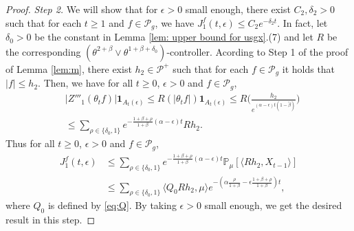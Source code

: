\documentclass[12pt,a4paper]{amsart}
\theoremstyle{plain}
\theoremstyle{definition}
\numberwithin{equation}{section}
\begin{document}
\begin{proof}
\emph{Step 2.} We will show that for $\epsilon>0$ small enough, there exist  $C_2, \delta_2>0$ such that for each $t\geq 1$ and
$f \in \mathcal P_g$, we have
\(
  J^f_1(t,\epsilon)
  \leq C_2e^{-\delta_2 t}.
\)
In fact, let $\delta_0 >0$ be the constant in Lemma \ref{lem: upper bound for usgx}.(7) and let $R$ be the corresponding $(\theta^{2+\beta}\vee \theta^{1+\beta+\delta_0})$-controller.
Acording to Step 1 of the proof of Lemma \ref{lem:m},
    there exist $h_{2} \in \mathcal P^+$ such that for each $f \in \mathcal P_g$ it holds that $|f| \leq h_{2}$.
Then, we have for all $t\geq 0$, $\epsilon> 0$ and $f\in \mathcal P_g$,
\begin{align}
  & |Z'''_1(\theta_t f)|\mathbf{1}_{A_{t}(\epsilon)}
     \leq R(|\theta_{t} f|)\mathbf{1}_{A_{t}(\epsilon)}
     \leq R \Big(\frac{h_{2}}{e^{(\alpha-\epsilon)t(1-\tilde \beta)}}\Big) \\
      & \leq \sum_{\rho \in \{\delta_0,1\}}e^{-\frac{1+\beta+\rho}{1+\beta}(\alpha-\epsilon)t}Rh_{2}.
\end{align}
 Thus for all $t\geq 0$, $\epsilon> 0$ and $f\in \mathcal P_g$,
\begin{align}
  \label{eq: estimate of J1}
  J^f_1(t,\epsilon)
& \leq \sum_{\rho \in \{\delta_0,1\}}e^{-\frac{1+\beta+\rho}{1+\beta}(\alpha-\epsilon)t}\mathbb{P}_{\mu}[\langle Rh_2,X_{t-1}\rangle]\\
& \leq \sum_{\rho \in \{\delta_0,1\}} \langle Q_0 R h_{2}, \mu \rangle e^{-(\alpha\frac{\rho}{1+\beta}-\epsilon\frac{1+\beta+\rho}{1+\beta})t},
\end{align}
where $Q_0$ is defined by \eqref{eq:Q}.
By taking $\epsilon>0$ small enough, we get the desired result in this step.


\end{proof}
\end{document}
